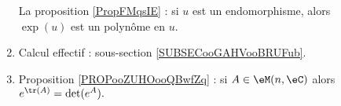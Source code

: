 \begin{description}
\begin{enumerate}
La proposition \ref{PropFMqsIE} : si \( u\) est un endomorphisme, alors \( \exp(u)\) est un polynôme en \( u\).
\item
    Calcul effectif : sous-section \ref{SUBSECooGAHVooBRUFub}.
\item Proposition \ref{PROPooZUHOooQBwfZq} : si \( A\in\eM(n,\eC)\) alors $ e^{\tr(A)}=\det( e^{A}).$

\end{enumerate}
\end{description}
